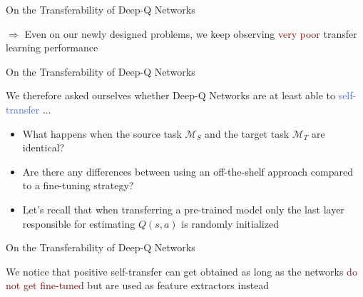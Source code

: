 \documentclass{beamer}
\begin{document}
\begin{frame}{On the Transferability of Deep-Q Networks}

	\bigskip
	$\Rightarrow$ Even on our newly designed problems, we keep observing \textcolor{Maroon}{very poor} transfer learning performance
	\bigskip
\begin{table}[ht!]
	\centering
	
	\label{tab:catch_tl_area_ratio}
\end{table}

\end{frame}

\begin{frame}{On the Transferability of Deep-Q Networks}
	
	\bigskip
	We therefore asked ourselves whether Deep-Q Networks are at least able to \textcolor{RoyalBlue}{self-transfer} ...
	\bigskip
	\begin{itemize}
		\item What happens when the source task $\mathcal{M}_S$ and the target task $\mathcal{M}_T$ are identical?
		\item Are there any differences between using an off-the-shelf approach compared to a fine-tuning strategy?
		\item Let's recall that when transferring a pre-trained model only the last layer responsible for estimating $Q(s,a)$ is randomly initialized
	\end{itemize}

\end{frame}

\begin{frame}{On the Transferability of Deep-Q Networks}
	
	We notice that positive self-transfer can get obtained as long as the networks \textcolor{Maroon}{do not get fine-tuned} but are used as feature extractors instead

	\begin{table}[ht!]
	\centering
	
	\label{tab:self_tl_area_ratio}
	\end{table}

\end{frame}
\end{document}
